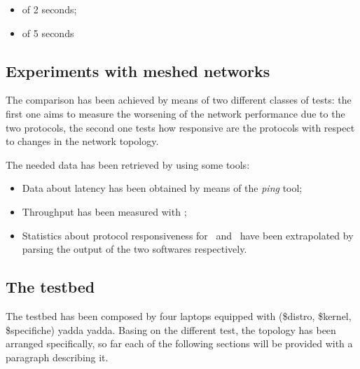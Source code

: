         \begin{itemize}
        \item   {} of 2 seconds;
        \item   {} of 5 seconds
        \end{itemize}

\subsection{Experiments with meshed networks}

    The comparison has been achieved by means of two different classes
    of tests: the first one aims to measure the worsening of the network
    performance due to the two protocols, the second one tests how
    responsive are the protocols with respect to changes in the
    network topology.

    The needed data has been retrieved by using some tools:
    \begin{itemize}
    \item   Data about latency has been obtained by means of the
            \emph{ping} tool;
    \item   Throughput has been measured with
            \netperf\cite{bib:NetPerf};
    \item   Statistics about protocol responsiveness for \batman\ and
            \olsr\ have been extrapolated by parsing the output of the
            two softwares respectively.
    \end{itemize}

\subsection{The testbed}

    The testbed has been composed by four laptops equipped with
    (\$distro, \$kernel, \$specifiche) yadda yadda. Basing on the
    different test, the topology has been arranged specifically, so
    far each of the following sections will be provided with a
    paragraph describing it.
